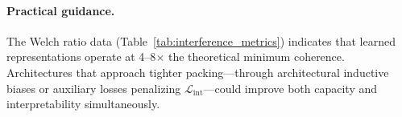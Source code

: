 \paragraph{Practical guidance.} The Welch ratio data (Table~\ref{tab:interference_metrics}) indicates that learned representations operate at 4--8$\times$ the theoretical minimum coherence. Architectures that approach tighter packing---through architectural inductive biases or auxiliary losses penalizing $\mathcal{L}_{\text{int}}$---could improve both capacity and interpretability simultaneously.
